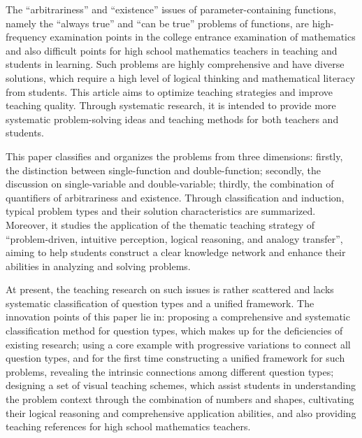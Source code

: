 \begin{abstract*}
  The ``arbitrariness'' and ``existence'' issues of parameter-containing functions, namely the ``always true'' and ``can be true'' problems of functions, are high-frequency examination points in the college entrance examination of mathematics and also difficult points for high school mathematics teachers in teaching and students in learning. Such problems are highly comprehensive and have diverse solutions, which require a high level of logical thinking and mathematical literacy from students. This article aims to optimize teaching strategies and improve teaching quality. Through systematic research, it is intended to provide more systematic problem-solving ideas and teaching methods for both teachers and students.

  This paper classifies and organizes the problems from three dimensions: firstly, the distinction between single-function and double-function; secondly, the discussion on single-variable and double-variable; thirdly, the combination of quantifiers of arbitrariness and existence. Through classification and induction, typical problem types and their solution characteristics are summarized. Moreover, it studies the application of the thematic teaching strategy of ``problem-driven, intuitive perception, logical reasoning, and analogy transfer'', aiming to help students construct a clear knowledge network and enhance their abilities in analyzing and solving problems.

  At present, the teaching research on such issues is rather scattered and lacks systematic classification of question types and a unified framework. The innovation points of this paper lie in: proposing a comprehensive and systematic classification method for question types, which makes up for the deficiencies of existing research; using a core example with progressive variations to connect all question types, and for the first time constructing a unified framework for such problems, revealing the intrinsic connections among different question types; designing a set of visual teaching schemes, which assist students in understanding the problem context through the combination of numbers and shapes, cultivating their logical reasoning and comprehensive application abilities, and also providing teaching references for high school mathematics teachers.
\end{abstract*}